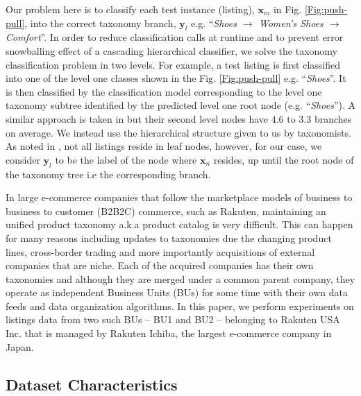 Our problem here is to classify each test instance (listing), $\bm{x}_m$ in Fig. \ref{Fig:push-pull}, into the correct taxonomy branch, $\bm{y}_l$ e.g. ``\textit{Shoes $\rightarrow$ Women's Shoes $\rightarrow$ Comfort}''.
In order to reduce classification calls at runtime and to prevent error snowballing effect of a cascading hierarchical classifier, we solve the taxonomy classification problem in two levels.
For example, a test listing is first classified into one of the level one classes shown in the Fig. \ref{Fig:push-pull} e.g. ``\textit{Shoes}''.
It is then classified by the classification model corresponding to the level one taxonomy subtree identified by the predicted level one root node (e.g. ``\textit{Shoes}'').
A similar approach is taken in \cite{Shen12} but their second level nodes have 4.6 to 3.3 branches on average.
We instead use the hierarchical structure given to us by taxonomists.
As noted in \cite{Julian15}, not all listings reside in leaf nodes, however, for our case, we consider $\bm{y}_l$ to be the label of the node where $\bm{x}_n$ resides, up until the root node of the taxonomy tree i.e the corresponding branch.

In large e-commerce companies that follow the marketplace models of business to business to customer (B2B2C) commerce, such as Rakuten, maintaining an unified product taxonomy a.k.a product catalog is very difficult. 
This can happen for many reasons including updates to taxonomies due the changing product lines, cross-border trading and more importantly acquisitions of external companies that are niche.
Each of the acquired companies has their own taxonomies and although they are merged under a common parent company, they operate as independent Business Units (BUs)  for some time with their own data feeds and data organization algorithms.
In this paper, we perform experiments on listings data from two such BUs -- BU1 and BU2 -- belonging to Rakuten USA Inc.
that is managed by Rakuten Ichiba, the largest e-commerce company in Japan.

\vspace{-0.2cm}
\subsection{Dataset Characteristics}
\label{Subsect:introduction>dataset}
\vspace{-0.2cm}

